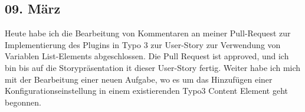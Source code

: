 \subsection{09. März}
Heute habe ich die Bearbeitung von Kommentaren an meiner Pull-Request zur Implementierung des Plugins in Typo 3 zur User-Story zur Verwendung von Variablen List-Elements abgeschlossen. Die Pull Request ist approved, und ich bin bis auf die Storypräsentation it dieser User-Story fertig. Weiter habe ich mich mit der Bearbeitung einer neuen Aufgabe, wo es um das Hinzufügen einer Konfigurationseinstellung in einem existierenden Typo3 Content Element geht begonnen.